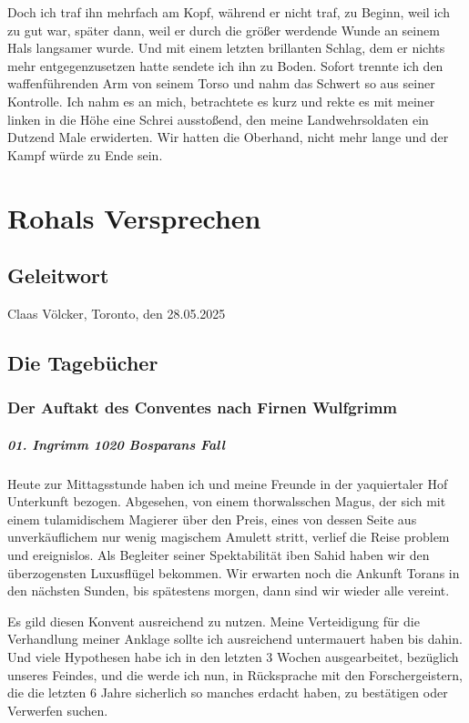 Doch ich traf ihn mehrfach am Kopf, während er nicht traf, zu Beginn, weil ich zu gut war, später dann, weil er durch die größer werdende Wunde an seinem Hals langsamer wurde. Und mit einem letzten brillanten Schlag, dem er nichts mehr entgegenzusetzen hatte sendete ich ihn zu Boden. Sofort trennte ich den waffenführenden Arm von seinem Torso und nahm das Schwert so aus seiner Kontrolle. Ich nahm es an mich, betrachtete es kurz und rekte es mit meiner linken in die Höhe eine Schrei ausstoßend, den meine Landwehrsoldaten ein Dutzend Male erwiderten. Wir hatten die Oberhand, nicht mehr lange und der Kampf würde zu Ende sein.



\chapter{Rohals Versprechen}

\section{Geleitwort}


\begin{flushright}
Claas Völcker, Toronto, den 28.05.2025
\end{flushright}


\section{Die Tagebücher}

\subsection{Der Auftakt des Conventes nach Firnen Wulfgrimm}
\paragraph{01. Ingrimm 1020 Bosparans Fall}
Heute zur Mittagsstunde haben ich und meine Freunde in der yaquiertaler Hof Unterkunft bezogen. Abgesehen, von einem thorwalsschen Magus, der sich mit einem tulamidischem Magierer über den Preis, eines von dessen Seite aus unverkäuflichem nur wenig magischem Amulett stritt, verlief die Reise problem und ereignislos. Als Begleiter seiner Spektabilität iben Sahid haben wir den überzogensten Luxusflügel bekommen. Wir erwarten noch die Ankunft Torans in den nächsten Sunden, bis spätestens morgen, dann sind wir wieder alle vereint.

Es gild diesen Konvent ausreichend zu nutzen. Meine Verteidigung für die Verhandlung meiner Anklage sollte ich ausreichend untermauert haben bis dahin. Und viele Hypothesen habe ich in den letzten 3 Wochen ausgearbeitet, bezüglich unseres Feindes, und die werde ich nun, in Rücksprache mit den Forschergeistern, die die letzten 6 Jahre sicherlich so manches erdacht haben, zu bestätigen oder Verwerfen suchen.

